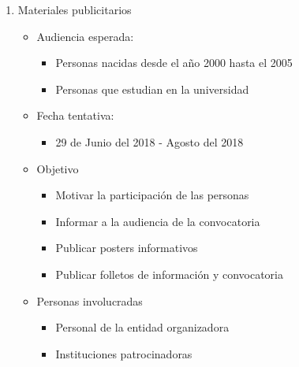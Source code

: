 \documentclass{article}
\begin{document}
\begin{enumerate}
\item Materiales publicitarios
\begin{itemize}
\item Audiencia esperada:
\begin{itemize}
\item Personas nacidas desde el año 2000 hasta el 2005
\item Personas que estudian en la universidad
\end{itemize}
\item Fecha tentativa:
\begin{itemize}
\item 29 de Junio del 2018 - Agosto del 2018
\end{itemize}
\item Objetivo
\begin{itemize}
\item Motivar la participación de las personas
\item Informar a la audiencia de la convocatoria
\item Publicar posters informativos
\item Publicar folletos de información y convocatoria
\end{itemize}
\item Personas involucradas
\begin{itemize}
\item Personal de la entidad organizadora 
\item Instituciones patrocinadoras
\end{itemize}
\end{itemize}



\end{enumerate}
\end{document}
